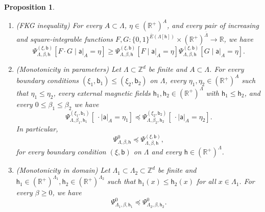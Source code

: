 \documentclass[11pt,a4paper]{article}
\numberwithin{equation}{section}
\theoremstyle{plain}
\newtheorem{Prop}[Thm]{Proposition}
\theoremstyle{definition}
\begin{document}
\begin{Prop}
\begin{enumerate}
\begin{equation}
\end{equation}
\item[$\bullet$]\textup{(FKG inequality)} For every $A \subset \Lambda$, $\eta \in (\mathbb R^+)^A$, and every pair of increasing and square-integrable functions $F,G: \{0,1\}^{\overline E(\Lambda[\mathsf{h}])}\times (\mathbb R^+)^{\overline{\Lambda}}\to\mathbb{R}$,
we have
\begin{equation}
\Psi_{\Lambda,\beta,\mathsf{h}}^{(\xi,\mathsf{b})}[F\cdot G \mid \mathsf a|_A=\eta]
\geq
\Psi_{\Lambda,\beta,\mathsf{h}}^{(\xi,\mathsf{b})}[F \mid \mathsf a|_A=\eta] \Psi_{\Lambda,\beta,\mathsf{h}}^{(\xi,\mathsf{b})}[G \mid \mathsf a|_A=\eta].
\end{equation}
\item[$\bullet$]\textup{(Monotonicity in parameters)} Let $\Lambda\subset \mathbb{Z}^d$ be finite and $A\subset \Lambda$. For every boundary conditions $(\xi_1,\mathsf{b}_1) \leq (\xi_2,\mathsf{b}_2)$ on $\Lambda$, every $\eta_1,\eta_2\in (\mathbb{R}^+)^{A}$ such that $\eta_1\leq \eta_2$, every external magnetic fields $\mathsf{h}_1,\mathsf{h}_2\in (\mathbb R^+)^\Lambda$ with $\mathsf h_1\leq \mathsf h_2$, and every $0\leq\beta_1\leq \beta_2$ we have
\begin{equation} \label{eq: conditional stochastic domiation}
\Psi_{\Lambda,\beta_1,\mathsf h_1}^{(\xi_1,\mathsf{b}_1)}[\:\cdot \mid \mathsf{a}|_A=\eta_1] \preccurlyeq \Psi_{\Lambda,\beta_2,\mathsf h_2}^{(\xi_2,\mathsf{b}_2)}[\:\cdot \mid \mathsf{a}|_A=\eta_2].
\end{equation}
In particular, 
\begin{equation}
\Psi^0_{\Lambda,\beta,\mathsf h} \preccurlyeq \Psi_{\Lambda,\beta,\mathsf h}^{(\xi,\mathsf{b})},
\end{equation}
for every boundary condition $(\xi,\mathsf{b})$ on $\Lambda$ and every $\mathsf{h}\in(\mathbb R^+)^\Lambda$. 

\item[$\bullet$]\textup{(Monotonicity in domain)} 
Let $\Lambda_1\subset \Lambda_2\subset \mathbb{Z}^d$ be finite and $\mathsf h_1\in (\mathbb{R}^+)^{\Lambda_1},\mathsf h_2\in (\mathbb{R}^+)^{\Lambda_2}$ such that $\mathsf h_1(x)\leq \mathsf h_2(x)$ for all $x\in \Lambda_1$. For every $\beta\geq 0$, we have
\begin{equation}
\Psi_{\Lambda_1,\beta,\mathsf{h}_1}^{0} \preccurlyeq \Psi_{\Lambda_2,\beta,\mathsf{h}_2}^{0}.
\end{equation}    
\end{enumerate}
\end{Prop}
\end{document}
